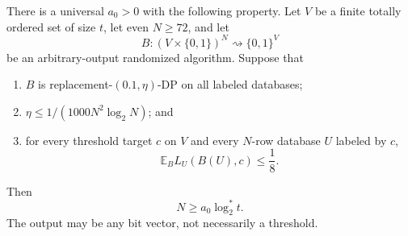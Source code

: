 \begin{proposition}
\label{prop:step-008-almm-expected}
There is a universal \(a_0>0\) with the following property.  Let \(V\)
be a finite totally ordered set of size \(t\), let even \(N\ge72\), and
let
\[
B:(V\times\{0,1\})^N\rightsquigarrow\{0,1\}^{V}
\]
be an arbitrary-output randomized algorithm.  Suppose that
\begin{enumerate}
\item \(B\) is replacement-\((0.1,\eta)\)-DP on all labeled databases;
\item \(\eta\le1/(1000N^2\log_2N)\); and
\item for every threshold target \(c\) on \(V\) and every \(N\)-row
database \(U\) labeled by \(c\),
\begin{equation}\label{eq:step-008-empirical-loss-premise}
\mathbb E_B L_U(B(U),c)\le\frac18.
\end{equation}
\end{enumerate}
Then
\begin{equation}\label{eq:step-008-almm-obstruction}
N\ge a_0\log_2^*t.
\end{equation}
The output may be any bit vector, not necessarily a threshold.
\end{proposition}

